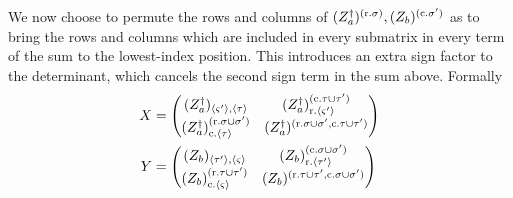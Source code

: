 	We now choose to permute the rows and columns of $(Z_a^\dagger)^{(\text{r.} \sigma)},(Z_b)^{(\text{c.} \sigma')}$ as to bring the rows and columns which are included in every submatrix in every term of the sum to the lowest-index position. This introduces an extra sign factor to the determinant, which cancels the second sign term in the sum above. Formally
	\begin{align}
	X &= \mqty(
		(Z_a\hc)_{\seq{\varsigma'},\seq{\tau}} & (Z_a\hc)^{(\text{c.} \tau\cup\tau')}_{\text{r.} \seq{\varsigma'}}\\
		(Z_a\hc)^{(\text{r.} \sigma\cup\sigma')}_{\text{c.} \seq{\tau}} & (Z_a\hc)^{(\text{r.} \sigma\cup\sigma', \text{c.} \tau\cup\tau')}
	)\\
	Y &= \mqty(
		(Z_b)_{\seq{\tau'},\seq{\varsigma}} & (Z_b)^{(\text{c.} \sigma\cup\sigma')}_{\text{r.} \seq{\tau'}}\\
		(Z_b)^{(\text{r.} \tau\cup\tau')}_{\text{c.} \seq{\varsigma}} & (Z_b)^{(\text{r.} \tau\cup\tau', \text{c.} \sigma\cup\sigma')}
	)
	\end{align}
	
